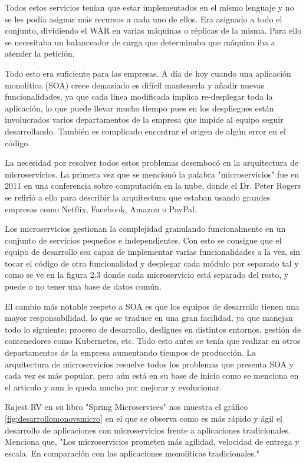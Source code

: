 \documentclass[12pt]{report} %
\begin{document}
Todos estos servicios tenían que estar implementados en el mismo lenguaje y no se les podía asignar más recursos a cada uno de ellos. Era asignado a todo el conjunto, dividiendo el WAR en varias máquinas o réplicas de la misma. Para ello se necesitaba un balanceador de carga que determinaba que máquina iba a atender la petición.


Todo esto era suficiente para las empresas. A día de hoy cuando una aplicación monolítica (SOA) crece demasiado es difícil mantenerla y añadir nuevas funcionalidades, ya que cada línea modificada implica re-desplegar toda la aplicación, lo que puede llevar mucho tiempo pues en los despliegues están involucrados varios departamentos de la empresa que impide al equipo seguir desarrollando. También es complicado encontrar el origen de algún error en el código.

La necesidad por resolver todos estos problemas desembocó en la arquitectura de microservicios. La primera vez que se mencionó la palabra "microservicios" fue en 2011 en una conferencia sobre computación en la nube, donde el Dr. Peter Rogers\cite{breveHistoria} se refirió a ello para describir la arquitectura que estaban usando grandes empresas como Netflix, Facebook, Amazon o PayPal. 

Los microservicios gestionan la complejidad granulando funcionalmente en un conjunto de servicios pequeños e independientes. Con esto se consigue que el equipo de desarrollo sea capaz de implementar varias funcionalidades a la vez, sin tocar el código de otra  funcionalidad y desplegar cada módulo por separado tal y como se ve en la figura 2.3 donde cada microservicio está separado del resto, y puede o no tener una base de datos común.

El cambio más notable respeto a SOA es que los equipos de desarrollo tienen una mayor responsabilidad, lo que se traduce en una gran facilidad, ya que manejan todo lo siguiente:  proceso de desarrollo, desligues en distintos entornos, gestión de contenedores como Kubernetes, etc. Todo esto antes se tenía que realizar en otros departamentos de la empresa aumentando tiempos de producción. La arquitectura de microservicios resuelve todos los problemas que presenta SOA y cada vez es más popular, pero aún está en su base de inicio como se menciona en el articulo\cite{Dragoni2017} y aun le queda mucho por mejorar y evolucionar.
 
 
 
Rajest RV en su libro "Spring Microservices"\cite{rv2016spring} nos muestra el gráfico \ref{fig:desarrollomonovsmicro} en el que se observa como es más rápido y ágil el desarrollo de aplicaciones con microservicios frente a aplicaciones tradicionales. Menciona que, "Los microservicios prometen más agilidad, velocidad de entrega y escala. En comparación con las aplicaciones monolíticas tradicionales." 
\end{document}

